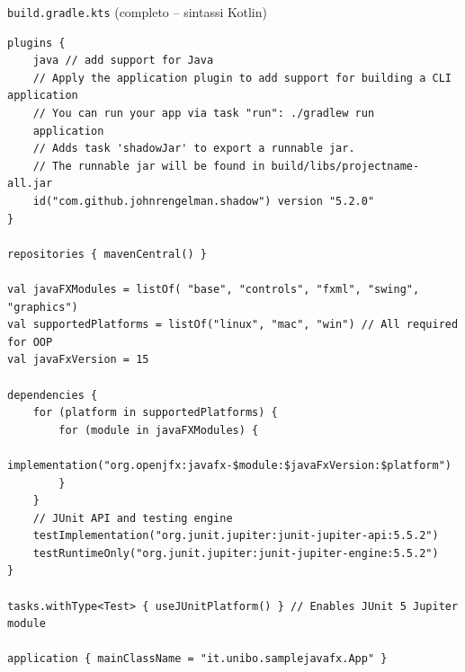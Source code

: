 \documentclass[xcolor=dvipsnames,presentation]{beamer}
\begin{document}
\begin{frame}[fragile]{\texttt{build.gradle.kts} (completo -- sintassi Kotlin)}
\begin{lstlisting}[basicstyle=\tiny\ttfamily]
plugins {
    java // add support for Java
    // Apply the application plugin to add support for building a CLI application
    // You can run your app via task "run": ./gradlew run
    application
    // Adds task 'shadowJar' to export a runnable jar.
    // The runnable jar will be found in build/libs/projectname-all.jar
    id("com.github.johnrengelman.shadow") version "5.2.0"
}

repositories { mavenCentral() }

val javaFXModules = listOf( "base", "controls", "fxml", "swing", "graphics")
val supportedPlatforms = listOf("linux", "mac", "win") // All required for OOP
val javaFxVersion = 15

dependencies {
    for (platform in supportedPlatforms) {
        for (module in javaFXModules) {
            implementation("org.openjfx:javafx-$module:$javaFxVersion:$platform")
        }
    }
    // JUnit API and testing engine
    testImplementation("org.junit.jupiter:junit-jupiter-api:5.5.2")
    testRuntimeOnly("org.junit.jupiter:junit-jupiter-engine:5.5.2")
}

tasks.withType<Test> { useJUnitPlatform() } // Enables JUnit 5 Jupiter module 

application { mainClassName = "it.unibo.samplejavafx.App" }
\end{lstlisting}
\end{frame}


%
%
%
%
%
%
\end{document}
